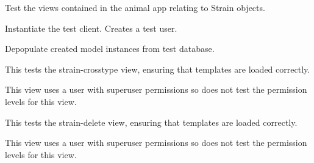 \documentclass[letterpaper,10pt,english]{sphinxmanual}
\begin{document}
\begin{fulllineitems}
\label{animals:mousedb.animal.tests.StrainViewTests}
Test the views contained in the animal app relating to Strain objects.

\begin{fulllineitems}
\label{animals:mousedb.animal.tests.StrainViewTests.setUp}
Instantiate the test client.  Creates a test user.

\end{fulllineitems}


\begin{fulllineitems}
\label{animals:mousedb.animal.tests.StrainViewTests.tearDown}
Depopulate created model instances from test database.

\end{fulllineitems}


\begin{fulllineitems}
\label{animals:mousedb.animal.tests.StrainViewTests.test_strain_crosstype}
This tests the strain-crosstype view, ensuring that templates are loaded correctly.

This view uses a user with superuser permissions so does not test the permission levels for this view.

\end{fulllineitems}


\begin{fulllineitems}
\label{animals:mousedb.animal.tests.StrainViewTests.test_strain_delete}
This tests the strain-delete view, ensuring that templates are loaded correctly.

This view uses a user with superuser permissions so does not test the permission levels for this view.

\end{fulllineitems}


\end{fulllineitems}
\end{document}
